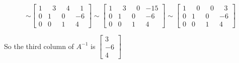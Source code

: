 \documentclass[12pt, oneside]{article}   	%
\begin{document}
\[\sim\left[ \begin{array}{rrrr}
1&\,\,\,\,3&\,\,\,\,4&\,\,\,\,1\\
0&1&0&-6\\
0&0&1&4\end{array}\right ]\sim
\left[ \begin{array}{rrrr}
1&\,\,\,\,3&\,\,\,\,0&-15\\
0&1&0&-6\\
0&0&1&4\end{array}\right ]\sim
\left[ \begin{array}{rrrr}
1&\,\,\,\,0&\,\,\,\,0&\,\,\,\,3\\
0&1&0&-6\\
0&0&1&4\end{array}\right ]\]
\begin{center}
So the third column of $A^{-1}$ is $\boxed{ \left[\begin{array}{r}
3\\
-6\\
4\end{array}\right]}$
\end{center}
\end{document}
